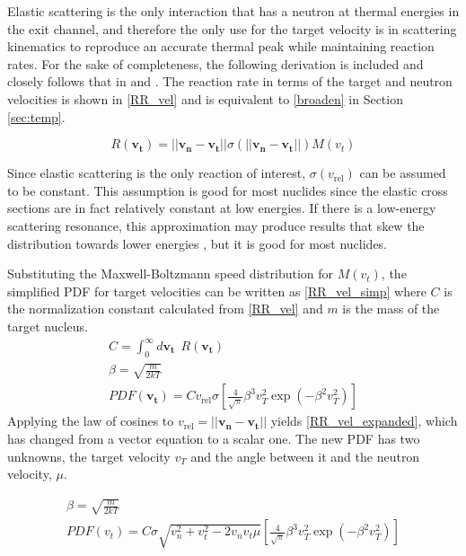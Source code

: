 Elastic scattering is the only interaction that has a neutron at thermal energies in the exit channel, and therefore the only use for the target velocity is in scattering kinematics to reproduce an accurate thermal peak while maintaining reaction rates.  For the sake of completeness, the following derivation is included and closely follows that in \cite{openmc} and \cite{gelbard}.  The reaction rate in terms of the target and neutron velocities is shown in \eqref{RR_vel} and is equivalent to \eqref{broaden} in Section \ref{sec:temp}.

\begin{equation}
\label{RR_vel}
R (\boldsymbol{v_t}) = ||\boldsymbol{v_n}-\boldsymbol{v_t}|| \sigma(||\boldsymbol{v_n}-\boldsymbol{v_t}||) M(v_t)
\end{equation}

Since elastic scattering is the only reaction of interest, $\sigma(v_\mathrm{rel})$ can be assumed to be constant.  This assumption is good for most nuclides since the elastic cross sections are in fact relatively constant at low energies.  If there is a low-energy scattering resonance, this approximation may produce results that skew the distribution towards lower energies \cite{openmc}, but it is good for most nuclides.  

Substituting the Maxwell-Boltzmann speed distribution for $M(v_t)$, the simplified PDF for target velocities can be written as \eqref{RR_vel_simp} where $C$ is the normalization constant calculated from \eqref{RR_vel} and $m$ is the mass of the target nucleus.
%
\begin{equation}
\label{RR_vel_simp}
\begin{gathered}
C = \int_0^\infty d\boldsymbol{v_t} \:\: R(\boldsymbol{v_t}) \\
\beta = \sqrt{\frac{m}{2kT}} \\
PDF(\boldsymbol{v_t}) = C v_\mathrm{rel} \sigma \left[   \frac{4}{\sqrt{\pi}} \beta^3 v_T^2  \exp (- \beta^2  v_T^2 )      \right]
\end{gathered}
\end{equation}
Applying the law of cosines to $v_\mathrm{rel} = ||\boldsymbol{v_n}-\boldsymbol{v_t}||$ yields \eqref{RR_vel_expanded}, which has changed from a vector equation to a scalar one.   The new PDF has two unknowns, the target velocity $v_T$ and the angle between it and the neutron velocity, $\mu$.

\begin{equation}
\label{RR_vel_expanded}
\begin{gathered}
\beta = \sqrt{\frac{m}{2kT}} \\
PDF(v_t) = C \sigma  \sqrt{v_n^2+v_t^2-2 v_n v_t \mu} \left[   \frac{4}{\sqrt{\pi}} \beta^3 v_T^2  \exp ( -\beta^2  v_T^2 )      \right]
\end{gathered}
\end{equation}

